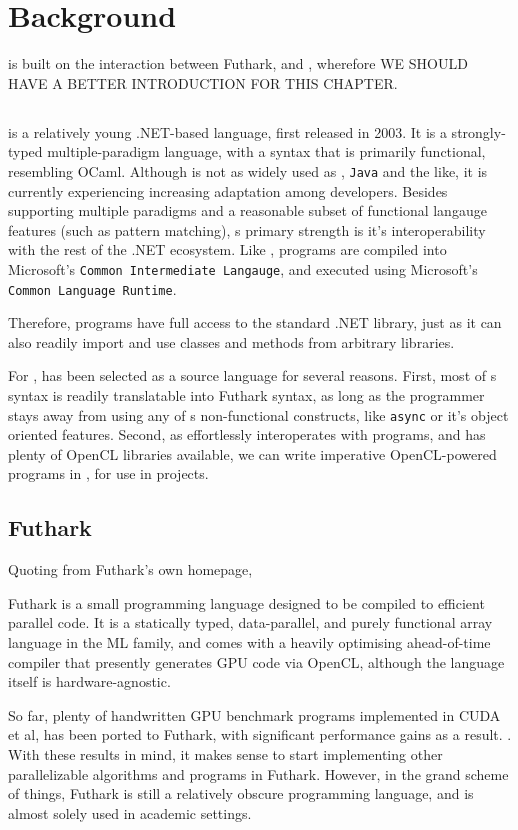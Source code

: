 \chapter{Background}
\fshark{} is built on the interaction between Futhark, \fsharp{} and \csharp{},
wherefore WE SHOULD HAVE A BETTER INTRODUCTION FOR THIS CHAPTER.

\section{\fsharp{}}
\fsharp{} is a relatively young .NET-based language, first released in 2003.
It is a strongly-typed multiple-paradigm language, with a syntax that is
primarily functional, resembling OCaml.
Although \fsharp{} is not as widely used as \csharp{}, \texttt{Java} and the
like, it is currently experiencing increasing adaptation among
developers\cite{citeme}.
Besides supporting multiple paradigms and a reasonable subset of functional
langauge features (such as pattern matching), \fsharp{}s primary strength is
it's interoperability with the rest of the .NET ecosystem. Like \csharp{},
\fsharp{} programs are compiled into Microsoft's \texttt{Common Intermediate
  Langauge}, and executed using Microsoft's \texttt{Common Language Runtime}.

Therefore, \fsharp{} programs have full access to the standard .NET library,
just as it can also readily import and use classes and methods from arbitrary
\csharp{} libraries.

For \fshark{}, \fsharp{} has been selected as a source language for several
reasons.
First, most of \fsharp{}s syntax is readily translatable into Futhark syntax, as
long as the programmer stays away from using any of \fsharp{}s non-functional
constructs, like \texttt{async} or it's object oriented features.
Second, as \fsharp{} effortlessly interoperates with \csharp{} programs, and
\csharp{} has plenty of OpenCL libraries available, we can write imperative
OpenCL-powered programs in \csharp{}, for use in \fsharp{} projects.


\section{Futhark}
Quoting from Futhark's own homepage,
\begin{formal}
  Futhark is a small programming language designed to be compiled to efficient parallel code. It is a statically typed, data-parallel, and purely functional array language in the ML family, and comes with a heavily optimising ahead-of-time compiler that presently generates GPU code via OpenCL, although the language itself is hardware-agnostic.
\end{formal}
So far, plenty of handwritten GPU benchmark programs implemented in CUDA et al,
has been ported to Futhark, with significant performance gains as a result.
\cite{citesomething}. With these results in mind, it makes sense to start
implementing other parallelizable algorithms and programs in Futhark. However,
in the grand scheme of things, Futhark is still a relatively obscure programming
language, and is almost solely used in academic settings.


